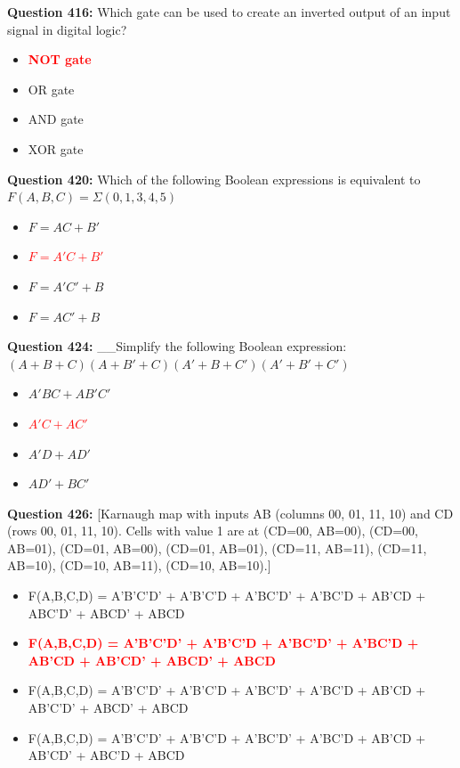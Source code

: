 \documentclass[12pt,a4paper]{article}
\begin{document}
\vspace{0.5cm}

\textbf{Question 416:} Which gate can be used to create an inverted output of an input signal in digital logic?

\begin{itemize}
    \item[\textbf{A.}] \textcolor{red}{\textbf{NOT gate}}
    \item[\textbf{B.}] OR gate
    \item[\textbf{C.}] AND gate
    \item[\textbf{D.}] XOR gate
\end{itemize}

\vspace{0.5cm}

\textbf{Question 420:} Which of the following Boolean expressions is equivalent to $F(A, B, C) = \Sigma(0, 1, 3, 4, 5)$

\begin{itemize}
    \item[\textbf{A.}] $F = AC + B'$
    \item[\textbf{B.}] \textcolor{red}{\textbf{$F = A'C + B'$}}
    \item[\textbf{C.}] $F = A'C' + B$
    \item[\textbf{D.}] $F = AC' + B$
\end{itemize}

\vspace{0.5cm}

\textbf{Question 424:} __Simplify the following Boolean expression: $(A + B + C)(A + B' + C)(A' + B + C')(A' + B' + C')$

\begin{itemize}
    \item[\textbf{A.}] $A'BC + AB'C'$
    \item[\textbf{B.}] \textcolor{red}{\textbf{$A'C + AC'$}}
    \item[\textbf{C.}] $A'D + AD'$
    \item[\textbf{D.}] $AD' + BC'$
\end{itemize}

\vspace{0.5cm}

\textbf{Question 426:} [Karnaugh map with inputs AB (columns 00, 01, 11, 10) and CD (rows 00, 01, 11, 10). Cells with value 1 are at (CD=00, AB=00), (CD=00, AB=01), (CD=01, AB=00), (CD=01, AB=01), (CD=11, AB=11), (CD=11, AB=10), (CD=10, AB=11), (CD=10, AB=10).]

\begin{itemize}
    \item[\textbf{A.}] F(A,B,C,D) = A'B'C'D' + A'B'C'D + A'BC'D' + A'BC'D + AB'CD + ABC'D' + ABCD' + ABCD
    \item[\textbf{B.}] \textcolor{red}{\textbf{F(A,B,C,D) = A'B'C'D' + A'B'C'D + A'BC'D' + A'BC'D + AB'CD + AB'CD' + ABCD' + ABCD}}
    \item[\textbf{C.}] F(A,B,C,D) = A'B'C'D' + A'B'C'D + A'BC'D' + A'BC'D + AB'CD + AB'C'D' + ABCD' + ABCD
    \item[\textbf{D.}] F(A,B,C,D) = A'B'C'D' + A'B'C'D + A'BC'D' + A'BC'D + AB'CD + AB'CD' + ABC'D + ABCD
\end{itemize}
\end{document}

